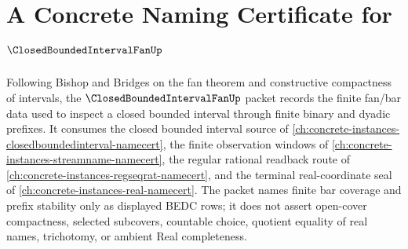 \chapter{A Concrete Naming Certificate for $\ClosedBoundedIntervalFanUp$}
\label{ch:concrete-instances-closed-bounded-interval-fan-namecert}

Following Bishop and Bridges on the fan theorem and constructive compactness of intervals, the $\ClosedBoundedIntervalFanUp$ packet records the finite fan/bar data used to inspect a closed bounded interval through finite binary and dyadic prefixes. It consumes the closed bounded interval source of \autoref{ch:concrete-instances-closedboundedinterval-namecert}, the finite observation windows of \autoref{ch:concrete-instances-streamname-namecert}, the regular rational readback route of \autoref{ch:concrete-instances-regseqrat-namecert}, and the terminal real-coordinate seal of \autoref{ch:concrete-instances-real-namecert}. The packet names finite bar coverage and prefix stability only as displayed BEDC rows; it does not assert open-cover compactness, selected subcovers, countable choice, quotient equality of real names, trichotomy, or ambient Real completeness.

